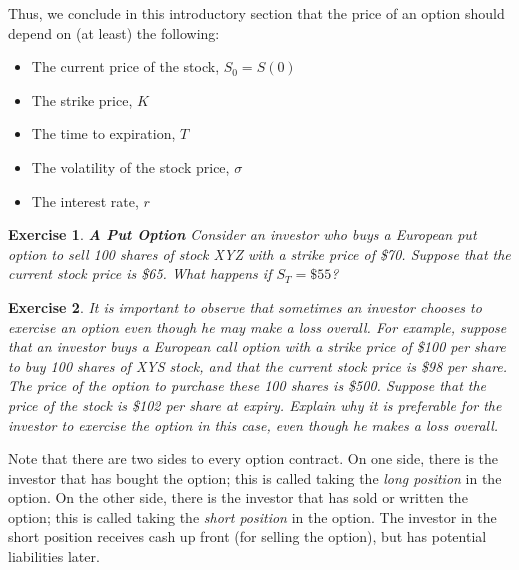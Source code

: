 \documentclass[letterpaper,10pt]{article}
\newtheorem{ex}{Exercise}
\begin{document}
Thus, we conclude in this introductory section that the price of an option should depend on (at least) the following:

\begin{itemize}

\item The current price of the stock, $S_0=S(0)$

\item The strike price, $K$

\item The time to expiration, $T$

\item The volatility of the stock price, $\sigma$

\item The interest rate, $r$

\end{itemize}



\begin{ex}{\bf A Put Option}
Consider an investor who buys a European put option to sell 100 shares of stock XYZ with a strike price of \$70.  Suppose that the current stock price is \$65.   What happens if $S_T=\$55$?



\end{ex}

\begin{ex}
It is important to observe that sometimes an investor chooses to exercise an option even though he may make a loss overall.  For example, suppose that an investor buys a European call option with a strike price of \$100 per share to buy 100 shares of XYS stock, and that the current stock price is \$98 per share.  The price of the option to purchase these 100 shares is \$500.  Suppose that the price of the stock is \$102 per share at expiry.  Explain why it is preferable for the investor to exercise the option in this case, even though he makes a loss overall.
\end{ex}




Note that there are two sides to every option contract.  On one side, there is the investor that has bought the option; this is called taking the {\em long position} in the option.  On the other side, there is the investor that has sold or written the option; this is called taking the {\em short position} in the option.  The investor in the short position receives cash up front (for selling the option), but has potential liabilities later.  
\end{document}
